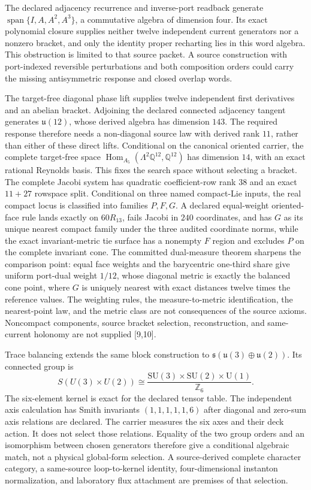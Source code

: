 \documentclass[10pt]{article}
\begin{document}
The declared adjacency recurrence and inverse-port readback generate
\(\operatorname{span}\{I,A,A^2,A^3\}\), a commutative algebra of dimension
four. Its exact polynomial closure supplies
neither twelve independent current generators nor a nonzero bracket, and only
the identity proper recharting lies in this word algebra. This obstruction is
limited to that source packet. A source construction with port-indexed
reversible perturbations and both composition orders could carry the missing
antisymmetric response and closed overlap words.

The target-free diagonal phase lift supplies twelve independent first
derivatives and an abelian bracket. Adjoining the declared connected
adjacency tangent generates \(\mathfrak u(12)\), whose derived algebra has
dimension \(143\). The required response therefore needs a non-diagonal
source law with derived rank \(11\), rather than either of these direct lifts.
Conditional on the canonical oriented carrier, the complete target-free
space \(\operatorname{Hom}_{A_5}(\Lambda^2\mathbb Q^{12},\mathbb Q^{12})\)
has dimension \(14\), with an exact rational Reynolds basis. This fixes the
search space without selecting a bracket. The complete Jacobi system has
quadratic coefficient-row rank \(38\) and an exact \(11+27\) rowspace split.
Conditional on three named compact-Lie inputs, the real compact locus is
classified into families \(P,F,G\). A declared equal-weight oriented-face rule
lands exactly on \(60R_{13}\), fails Jacobi in \(240\) coordinates, and
has \(G\) as its unique nearest compact family under the three audited
coordinate norms, while the exact invariant-metric tie surface has a
nonempty \(F\) region and excludes \(P\) on the complete invariant cone.
The committed dual-measure theorem sharpens the comparison point: equal
face weights and the barycentric one-third share give uniform port-dual
weight \(1/12\), whose diagonal metric is exactly the balanced cone point,
where \(G\) is uniquely nearest with exact distances twelve times the
reference values. The weighting rules, the measure-to-metric
identification, the nearest-point law, and the metric class are not
consequences of the source axioms. Noncompact components, source bracket
selection, reconstruction, and same-current holonomy are not supplied
[9,10].

Trace balancing extends the same block construction to
\(\mathfrak s(\mathfrak u(3)\oplus\mathfrak u(2))\). Its connected group is
\[
 S(U(3)\times U(2))
 \cong
 \frac{\mathrm{SU}(3)\times\mathrm{SU}(2)\times\mathrm U(1)}
 {\mathbb Z_6}.
\]
The six-element kernel is exact for the declared tensor table. The
independent axis calculation has Smith invariants
\((1,1,1,1,1,6)\) after diagonal and zero-sum axis relations are declared.
The carrier measures the six axes and their deck action. It does not select
those relations. Equality of the two group orders and an isomorphism between
chosen generators therefore give a conditional algebraic match, not a
physical global-form selection. A source-derived complete character
category, a same-source loop-to-kernel identity, four-dimensional instanton
normalization, and laboratory flux attachment are premises of that
selection.
\end{document}
